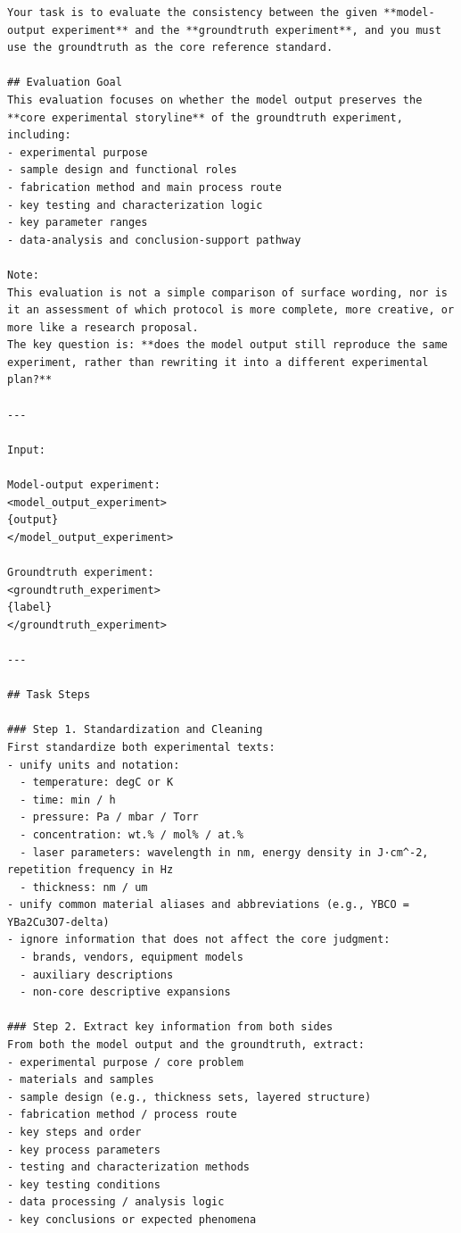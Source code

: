\begin{lstlisting}[style=jsonstyle]
Your task is to evaluate the consistency between the given **model-output experiment** and the **groundtruth experiment**, and you must use the groundtruth as the core reference standard.

## Evaluation Goal
This evaluation focuses on whether the model output preserves the **core experimental storyline** of the groundtruth experiment, including:
- experimental purpose
- sample design and functional roles
- fabrication method and main process route
- key testing and characterization logic
- key parameter ranges
- data-analysis and conclusion-support pathway

Note:
This evaluation is not a simple comparison of surface wording, nor is it an assessment of which protocol is more complete, more creative, or more like a research proposal.
The key question is: **does the model output still reproduce the same experiment, rather than rewriting it into a different experimental plan?**

---

Input:

Model-output experiment:
<model_output_experiment>
{output}
</model_output_experiment>

Groundtruth experiment:
<groundtruth_experiment>
{label}
</groundtruth_experiment>

---

## Task Steps

### Step 1. Standardization and Cleaning
First standardize both experimental texts:
- unify units and notation:
  - temperature: degC or K
  - time: min / h
  - pressure: Pa / mbar / Torr
  - concentration: wt.% / mol% / at.%
  - laser parameters: wavelength in nm, energy density in J·cm^-2, repetition frequency in Hz
  - thickness: nm / um
- unify common material aliases and abbreviations (e.g., YBCO = YBa2Cu3O7-delta)
- ignore information that does not affect the core judgment:
  - brands, vendors, equipment models
  - auxiliary descriptions
  - non-core descriptive expansions

### Step 2. Extract key information from both sides
From both the model output and the groundtruth, extract:
- experimental purpose / core problem
- materials and samples
- sample design (e.g., thickness sets, layered structure)
- fabrication method / process route
- key steps and order
- key process parameters
- testing and characterization methods
- key testing conditions
- data processing / analysis logic
- key conclusions or expected phenomena


\end{lstlisting}
